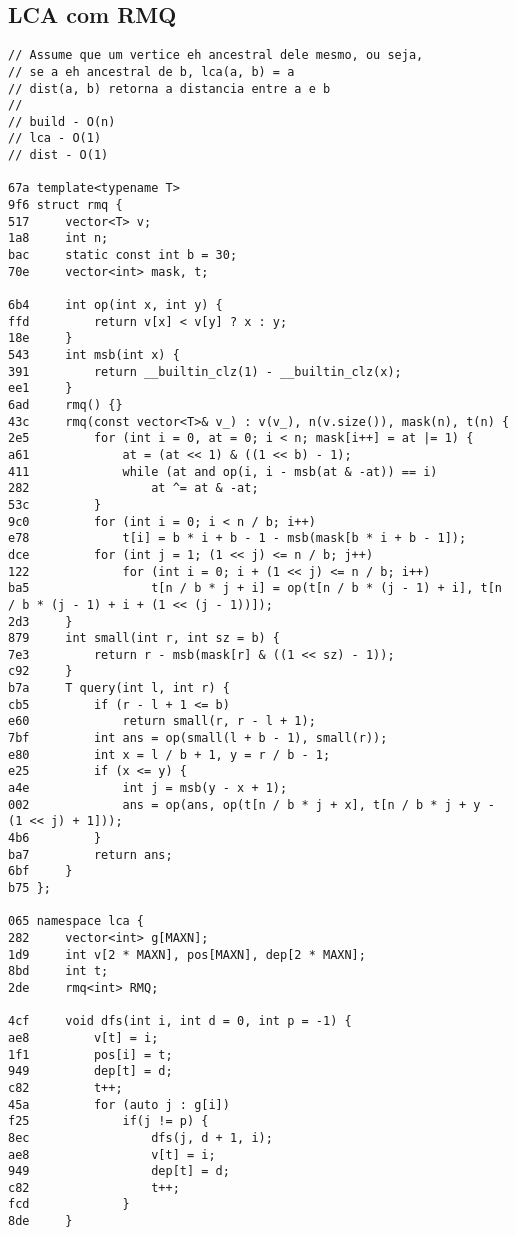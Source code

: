 \documentclass[11pt, a4paper, twoside]{article}
\begin{document}
\subsection{LCA com RMQ}
\begin{lstlisting}
// Assume que um vertice eh ancestral dele mesmo, ou seja,
// se a eh ancestral de b, lca(a, b) = a
// dist(a, b) retorna a distancia entre a e b
//
// build - O(n)
// lca - O(1)
// dist - O(1)

67a template<typename T> 
9f6 struct rmq {
517     vector<T> v;
1a8     int n; 
bac     static const int b = 30;
70e     vector<int> mask, t;
    
6b4     int op(int x, int y) { 
ffd         return v[x] < v[y] ? x : y; 
18e     }
543     int msb(int x) { 
391         return __builtin_clz(1) - __builtin_clz(x); 
ee1     }
6ad     rmq() {}
43c     rmq(const vector<T>& v_) : v(v_), n(v.size()), mask(n), t(n) {
2e5         for (int i = 0, at = 0; i < n; mask[i++] = at |= 1) {
a61             at = (at << 1) & ((1 << b) - 1);
411             while (at and op(i, i - msb(at & -at)) == i)
282                 at ^= at & -at;
53c         }
9c0         for (int i = 0; i < n / b; i++) 
e78             t[i] = b * i + b - 1 - msb(mask[b * i + b - 1]);
dce         for (int j = 1; (1 << j) <= n / b; j++) 
122             for (int i = 0; i + (1 << j) <= n / b; i++)
ba5                 t[n / b * j + i] = op(t[n / b * (j - 1) + i], t[n / b * (j - 1) + i + (1 << (j - 1))]);
2d3     }
879     int small(int r, int sz = b) { 
7e3         return r - msb(mask[r] & ((1 << sz) - 1)); 
c92     }
b7a     T query(int l, int r) {
cb5         if (r - l + 1 <= b)
e60             return small(r, r - l + 1);
7bf         int ans = op(small(l + b - 1), small(r));
e80         int x = l / b + 1, y = r / b - 1;
e25         if (x <= y) {
a4e             int j = msb(y - x + 1);
002             ans = op(ans, op(t[n / b * j + x], t[n / b * j + y - (1 << j) + 1]));
4b6         }
ba7         return ans;
6bf     }
b75 };

065 namespace lca {
282     vector<int> g[MAXN];
1d9     int v[2 * MAXN], pos[MAXN], dep[2 * MAXN];
8bd     int t;
2de     rmq<int> RMQ;
        
4cf     void dfs(int i, int d = 0, int p = -1) {
ae8         v[t] = i;
1f1         pos[i] = t;
949         dep[t] = d;
c82         t++;
45a         for (auto j : g[i])
f25             if(j != p) {
8ec                 dfs(j, d + 1, i);
ae8                 v[t] = i;
949                 dep[t] = d;
c82                 t++;
fcd             }
8de     }
        

\end{lstlisting}
\end{document}
